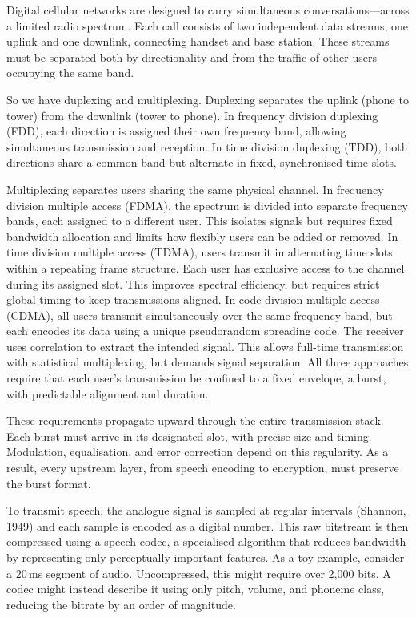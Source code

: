 Digital cellular networks are designed to carry simultaneous conversations—across a limited radio spectrum. Each call consists of two independent data streams, one uplink and one downlink, connecting handset and base station. These streams must be separated both by directionality and from the traffic of other users occupying the same band.

So we have duplexing and multiplexing. Duplexing separates the uplink (phone to tower) from the downlink (tower to phone). In frequency division duplexing (FDD), each direction is assigned their own frequency band, allowing simultaneous transmission and reception. In time division duplexing (TDD), both directions share a common band but alternate in fixed, synchronised time slots.

Multiplexing separates users sharing the same physical channel. In frequency division multiple access (FDMA), the spectrum is divided into separate frequency bands, each assigned to a different user. This isolates signals but requires fixed bandwidth allocation and limits how flexibly users can be added or removed. In time division multiple access (TDMA), users transmit in alternating time slots within a repeating frame structure. Each user has exclusive access to the channel during its assigned slot. This improves spectral efficiency, but requires strict global timing to keep transmissions aligned. In code division multiple access (CDMA), all users transmit simultaneously over the same frequency band, but each encodes its data using a unique pseudorandom spreading code. The receiver uses correlation to extract the intended signal. This allows full-time transmission with statistical multiplexing, but demands signal separation. All three approaches require that each user's transmission be confined to a fixed envelope, a burst, with predictable alignment and duration.

These requirements propagate upward through the entire transmission stack. Each burst must arrive in its designated slot, with precise size and timing. Modulation, equalisation, and error correction depend on this regularity. As a result, every upstream layer, from speech encoding to encryption, must preserve the burst format.

To transmit speech, the analogue signal is sampled at regular intervals (Shannon, 1949) and each sample is encoded as a digital number. This raw bitstream is then compressed using a speech codec, a specialised algorithm that reduces bandwidth by representing only perceptually important features. As a toy example, consider a 20 ms segment of audio. Uncompressed, this might require over 2,000 bits. A codec might instead describe it using only pitch, volume, and phoneme class, reducing the bitrate by an order of magnitude.

